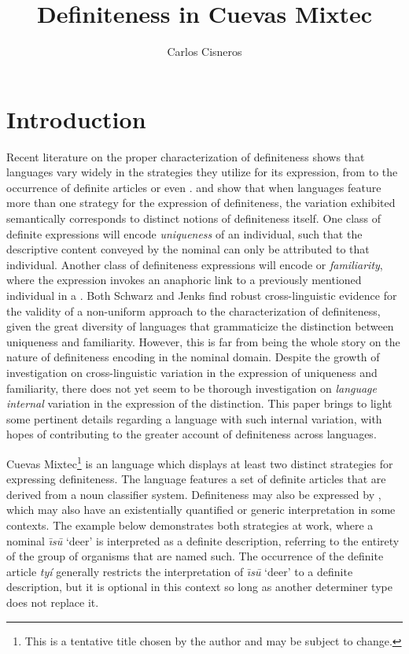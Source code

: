 \documentclass[output=paper,modfonts,nonflat]{langsci/langscibook}
\title{Definiteness in Cuevas Mixtec}
\author{%
 Carlos Cisneros\affiliation{University of Chicago}
}
\begin{document}
\maketitle

\section{Introduction} \label{sec:cisneros:1}

Recent literature on the proper characterization of definiteness shows that languages vary widely in the strategies they utilize for its expression, from  to the occurrence of definite articles or even .  \citet{Schwarz2009} and \citet{Jenks2015} show that when languages feature more than one strategy for the expression of definiteness, the variation exhibited semantically corresponds to distinct notions of definiteness itself.  One class of definite expressions will encode \textit{uniqueness} of an individual, such that the descriptive content conveyed by the nominal can only be attributed to that individual.  Another class of definiteness expressions will encode  or \textit{familiarity}, where the expression invokes an anaphoric link to a previously mentioned individual in a . Both Schwarz and Jenks find robust cross-linguistic evidence for the validity of a non-uniform approach to the characterization of definiteness, given the great diversity of languages that grammaticize the distinction between uniqueness and familiarity.  However, this is far from being the whole story on the nature of definiteness encoding in the nominal domain.  Despite the growth of investigation on cross-linguistic variation in the expression of uniqueness and familiarity, there does not yet seem to be thorough investigation on \textit{language internal} variation in the expression of the distinction.  This paper brings to light some pertinent details regarding a language with such internal variation, with hopes of contributing to the greater account of definiteness across languages.

Cuevas Mixtec\footnote{This is a tentative title chosen by the author and may be subject to change.} is an  language which displays at least two distinct strategies for expressing definiteness.  The language features a set of definite articles that are derived from a noun classifier system.  Definiteness may also be expressed by , which may also have an existentially quantified or generic interpretation in some contexts.  The example below demonstrates both strategies at work, where a nominal \textit{\=\i s\=u} `deer' is interpreted as a definite description, referring to the entirety of the group of organisms that are named such.  The occurrence of the definite article \textit{ty\'i} generally restricts the interpretation of \textit{\=\i s\=u} `deer' to a definite description, but it is optional in this context so long as another determiner type does not replace it.
\end{document}
